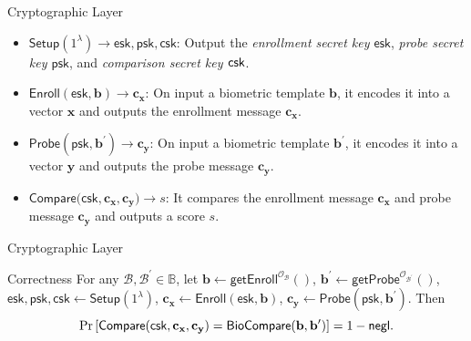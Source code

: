 \begin{frame}{Cryptographic Layer}

\pause
\begin{itemize}

	\item $\textsf{Setup}(1^\lambda) \to \textsf{esk}, \textsf{psk}, \textsf{csk}$: Output the \emph{enrollment secret key $\textsf{esk}$}, \emph{probe secret key $\textsf{psk}$}, and \emph{comparison secret key $\sf csk$}.
	\pause

	\item $\textsf{Enroll}(\textsf{esk}, \mathbf{b}) \to \mathbf{c_x}$: On input a biometric template $\mathbf{b}$, it encodes it into a vector $\mathbf{x}$ and outputs the enrollment message $\mathbf{c_x}$.
	\pause

	\item $\textsf{Probe}(\textsf{psk}, \mathbf{b}^\prime) \to \mathbf{c_y}$: On input a biometric template $\mathbf{b}^\prime$, it encodes it into a vector $\mathbf{y}$ and outputs the probe message $\mathbf{c_y}$.
	\pause

	\item $\textsf{Compare}(\textsf{csk}, \mathbf{c_x}, \mathbf{c_y)} \to s$: It compares the enrollment message $\mathbf{c_x}$ and probe message $\mathbf{c_y}$ and outputs a score $s$.

\end{itemize}

\end{frame}


\begin{frame}{Cryptographic Layer}

\begin{block}{Correctness} 
For any $\mathcal{B}, \mathcal{B}^\prime \in \mathbb{B}$, \pause
let $\mathbf{b} \gets \textsf{getEnroll}^{\mathcal{O}_\mathcal{B}}()$, $\mathbf{b}^\prime \gets \textsf{getProbe}^{\mathcal{O}_{\mathcal{B}^\prime}}()$, \pause
$\textsf{esk}, \textsf{psk}, \textsf{csk} \gets \textsf{Setup}(1^\lambda)$, \pause
$\mathbf{c_x} \gets \textsf{Enroll}(\textsf{esk}, \mathbf{b})$, \pause
$\mathbf{c_y} \gets \textsf{Probe}(\textsf{psk}, \mathbf{b}^\prime)$.
\pause
Then
	\[
		\Pr \left [
			\textsf{Compare}(\textsf{csk}, \mathbf{c_x}, \mathbf{c_y}) = \textsf{BioCompare}(\mathbf{b}, \mathbf{b}^\prime)
		\right ] = 1 - \mathsf{negl}.
	\]
\end{block}

\end{frame}






